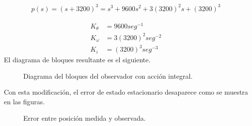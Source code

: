 \documentclass[a4paper, 10pt, onecolumn,journal]{ieeeconf}
\begin{document}
\begin{align}
	p(s) = \left( s + 3200\right) ^3 = s^3 + 9600 s^2 + 3(3200)^2 s + (3200)^3\label{polinomeo caracteristico de observador nuevo deseado}
\end{align}

\begin{align}
	K_{\theta} &= 9600 seg^{-1} \label{ganacia de posicion de observador nuevo}\\
	K_{\omega} &= 3(3200)^2 seg^{-2} \label{ganacia de velocidad de observador nuevo}\\
	K_{i} &= (3200)^3 seg^{-3} \label{ganacia integral de observador nuevo}
\end{align}
El diagrama de bloques resultante es el siguiente.
\begin{figure}[H]
	\centering
	\begin{adjustbox}{scale=0.5,max width=\columnwidth}
	\end{adjustbox}
	\caption{Diagrama del bloques del observador con acción integral.}
	\label{Diagrama del bloques del observador con acción integrale}
\end{figure}
Con esta modificación, el error de estado estacionario desaparece como se muestra en las figuras.
\begin{figure}[H]
	\centering
	\begin{adjustbox}{scale=0.65,max width=\columnwidth}
	\end{adjustbox}
	\caption{Error entre posición medida y observada.}
	\label{Error entre posición medida y observada}
\end{figure}
\end{document}
